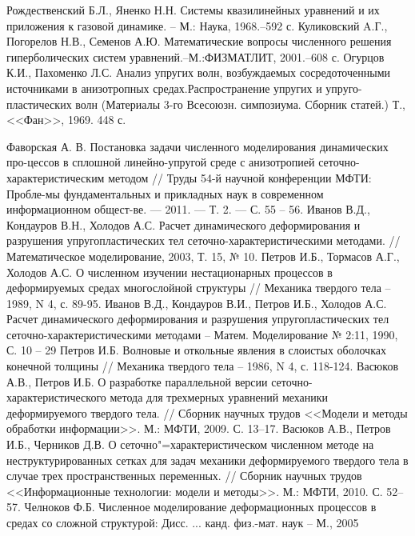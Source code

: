\begin{thebibliography}{99}
Рождественский Б.Л., Яненко Н.Н. Системы квазилинейных уравнений и их приложения к газовой динамике. -- М.: Наука, 1968.--592 с.
Куликовский A.Г., Погорелов Н.В., Семенов А.Ю. Математические вопросы численного решения гиперболических систем уравнений.--М.:ФИЗМАТЛИТ, 2001.--608 с.
Огурцов К.И., Пахоменко Л.С. Анализ упругих волн, возбуждаемых сосредоточенными источниками в анизотропных средах.Распространение упругих и упруго-пластических волн (Материалы 3-го Всесоюзн. симпозиума. Сборник статей.) Т., <<Фан>>, 1969. 448 с.

Фаворская А. В. Постановка задачи численного моделирования динамических про-цессов в сплошной линейно-упругой среде с анизотропией сеточно-характеристическим методом // Труды 54-й научной конференции МФТИ: Пробле-мы фундаментальных и прикладных наук в современном информационном общест-ве. — 2011. — Т. 2. — С. 55 – 56.
Иванов В.Д., Кондауров В.Н., Холодов А.С. Расчет динамического деформирования и разрушения упругопластических тел сеточно-характеристическими методами. // Математическое моделирование, 2003, Т. 15, № 10.
Петров  И.Б., Тормасов А.Г., Холодов А.С. О численном изучении нестационарных процессов в деформируемых средах многослойной структуры // Механика твердого тела – 1989, N 4, с. 89-95.
 Иванов В.Д., Кондауров В.И., Петров И.Б., Холодов А.С. Расчет динамического деформирования и разрушения упругопластических тел сеточно-характеристическими методами – Матем. Моделирование № 2:11, 1990, С. 10 – 29
Петров И.Б. Волновые и откольные явления в слоистых оболочках конечной толщины // Механика твердого тела – 1986, N 4, с. 118-124.
 Васюков А.В., Петров И.Б. О разработке параллельной версии сеточно-характеристического метода для трехмерных уравнений механики деформируемого твердого тела. // Сборник научных трудов <<Модели и методы обработки информации>>. М.: МФТИ, 2009. С. 13--17.
 Васюков А.В., Петров И.Б., Черников Д.В. О сеточно"=характеристическом численном методе на неструктурированных сетках для задач механики деформируемого твердого тела в случае трех пространственных переменных. // Сборник научных трудов <<Информационные технологии: модели и методы>>. М.: МФТИ, 2010. С. 52--57.
Челноков Ф.Б. Численное моделирование деформационных процессов в средах со сложной структурой: Дисс. ... канд. физ.-мат. наук – М., 2005

\end{thebibliography}
	
